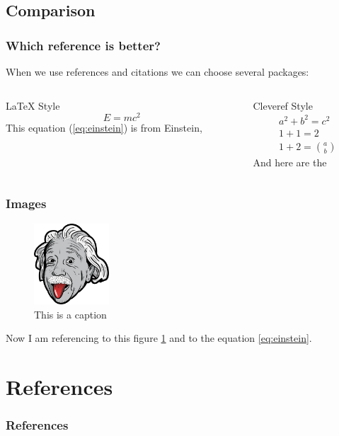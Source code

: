 \documentclass[aspectratio=169]{beamer}
\begin{document}
\subsection{Comparison}
\begin{frame}
    \frametitle{Which reference is better?}

    When we use references and citations we can choose several packages:
    \begin{center}
    \begin{columns}[T]
        \begin{column}{0.5\textwidth}
            LaTeX Style\\
            \begin{equation}
                E = mc^2\label{eq:einstein}
            \end{equation}
            \vfill
            This equation (\ref{eq:einstein}) is from Einstein, \cite{Einstein1919}
        \end{column}
        \begin{column}{0.5\textwidth}
            Cleveref Style\\
            \begin{align}
                a^2 + b^2 = c^2 \label{eq:pythagoras}\\
                1 + 1 = 2 \label{eq:nonsense}\\
                1+2  = \binom{a}{b} \label{eq:3}
            \end{align}
            \vfill
            And here are the          
        \end{column}
    \end{columns}
\end{center}
\end{frame}

\begin{frame}
    \frametitle{Images}

    \begin{figure}[t]
        \centering
        \includegraphics[width=0.25\textwidth]{./img/einstein.png}
        \caption{This is a caption}
        \label{fig:einstein}
    \end{figure}

    Now I am referencing to this figure \ref{fig:einstein} and to the equation \ref{eq:einstein}.

\end{frame}

\section{References}

\begin{frame}
    \frametitle{References}
    \printbibliography
\end{frame}
\end{document}
